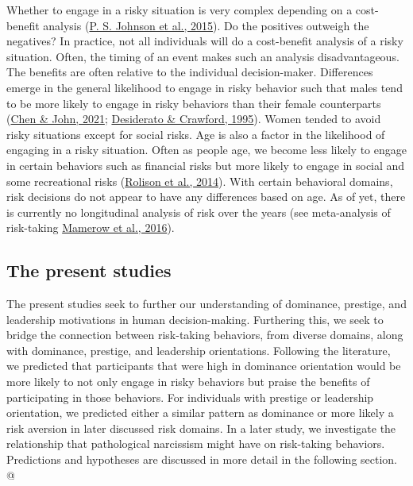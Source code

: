 \documentclass[
  donotrepeattitle,doc, 12pt, a4paper,floatsintext]{apa7}
\begin{document}
Whether to engage in a risky situation is very complex depending on a cost-benefit analysis (\protect\hyperlink{ref-johnson2015a}{P. S. Johnson et al., 2015}). Do the positives outweigh the negatives? In practice, not all individuals will do a cost-benefit analysis of a risky situation. Often, the timing of an event makes such an analysis disadvantageous. The benefits are often relative to the individual decision-maker. Differences emerge in the general likelihood to engage in risky behavior such that males tend to be more likely to engage in risky behaviors than their female counterparts (\protect\hyperlink{ref-chen2021}{Chen \& John, 2021}; \protect\hyperlink{ref-desiderato1995}{Desiderato \& Crawford, 1995}). Women tended to avoid risky situations except for social risks. Age is also a factor in the likelihood of engaging in a risky situation. Often as people age, we become less likely to engage in certain behaviors such as financial risks but more likely to engage in social and some recreational risks (\protect\hyperlink{ref-rolison2014}{Rolison et al., 2014}). With certain behavioral domains, risk decisions do not appear to have any differences based on age. As of yet, there is currently no longitudinal analysis of risk over the years (see meta-analysis of risk-taking \protect\hyperlink{ref-mamerow2016}{Mamerow et al., 2016}).

\hypertarget{the-present-studies}{%
\subsection{The present studies}\label{the-present-studies}}

The present studies seek to further our understanding of dominance, prestige, and leadership motivations in human decision-making. Furthering this, we seek to bridge the connection between risk-taking behaviors, from diverse domains, along with dominance, prestige, and leadership orientations. Following the literature, we predicted that participants that were high in dominance orientation would be more likely to not only engage in risky behaviors but praise the benefits of participating in those behaviors. For individuals with prestige or leadership orientation, we predicted either a similar pattern as dominance or more likely a risk aversion in later discussed risk domains. In a later study, we investigate the relationship that pathological narcissism might have on risk-taking behaviors. Predictions and hypotheses are discussed in more detail in the following section. @
\end{document}
